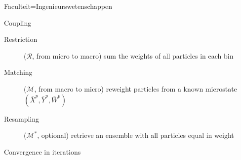 \documentclass[landscape,a1paper,fontscale=0.45]{kuleuvenposter}
\begin{document}
\begin{poster}{Faculteit=Ingenieurswetenschappen}
\begin{posterbox}[name=macroscopic, column=1,row=0, above=parareal micro-macro]{Coupling}
\begin{description}
\item[Restriction]($\mathcal{R}$, from micro to macro) sum the weights of all particles in each bin
\item[Matching]($\mathcal{M}$, from macro to micro) reweight particles from a known microstate $(\bar{X}^p, \bar{Y}^p, \bar{W}^p)$
\item[Resampling]($\mathcal{M}^*$, optional) retrieve an ensemble with all particles equal in weight
\end{description}
\end{posterbox}

\begin{posterbox}[name=convergenceK, column=2, below=notset, above=bottom, borderColor=KULeuvenFaculteit]{Convergence in iterations}%
\end{posterbox}


\end{poster}
\end{document}
